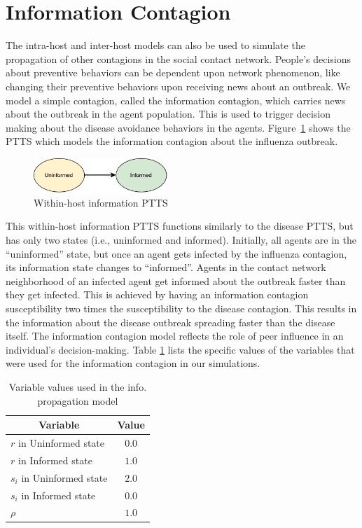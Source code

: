 \documentclass[doublespace]{VTthesis}
\begin{document}
    \section{Information Contagion}
    The intra-host and inter-host models can also be used to simulate the propagation of other contagions in the social contact network. People's decisions about preventive behaviors can be dependent upon network phenomenon, like changing their preventive behaviors upon receiving news about an outbreak. We model a simple contagion, called the information contagion, which carries news about the outbreak in the agent population. This is used to trigger decision making about the disease avoidance behaviors in the agents. Figure~\ref{fig:information} shows the PTTS which models the information contagion about the influenza outbreak. 
    \begin{figure}
    \centering
    \includegraphics[width=0.45\textwidth]{figures/information-fsm.pdf}
    \caption{Within-host information PTTS}
    \label{fig:information}
    \end{figure}
    This within-host information PTTS functions similarly to the disease PTTS, but has only two states (i.e., uninformed and informed). Initially, all agents are in the ``uninformed'' state, but once an agent gets infected by the influenza contagion, its information state changes to ``informed''. Agents in the contact network neighborhood of an infected agent get informed about the outbreak faster than they get infected. This is achieved by having an information contagion susceptibility two times the susceptibility to the disease contagion. This results in the information about the disease outbreak spreading faster than the disease itself. The information contagion model reflects the role of peer influence in an individual's decision-making. Table \ref{table:2} lists the specific values of the variables that were used for the information contagion in our simulations.
    \begin{table}[!t]
    \renewcommand{\arraystretch}{1.2}
    \caption{Variable values used in the info. propagation model}
    \centering
    \begin{tabular}{|l|c|}
    \hline
    \multicolumn{1}{|c|}{\textbf{Variable}} & \textbf{Value}  \\ \hline
    $r$ in Uninformed state & $0.0$ \\ \hline
    $r$ in Informed state & $1.0$ \\ \hline
    $s_i$ in Uninformed state & $2.0$ \\ \hline
    $s_i$ in Informed state & $0.0$ \\ \hline 
    $\rho$ & $1.0$ \\ \hline
    \end{tabular}
    \label{table:2}
    \end{table}
\end{document}
